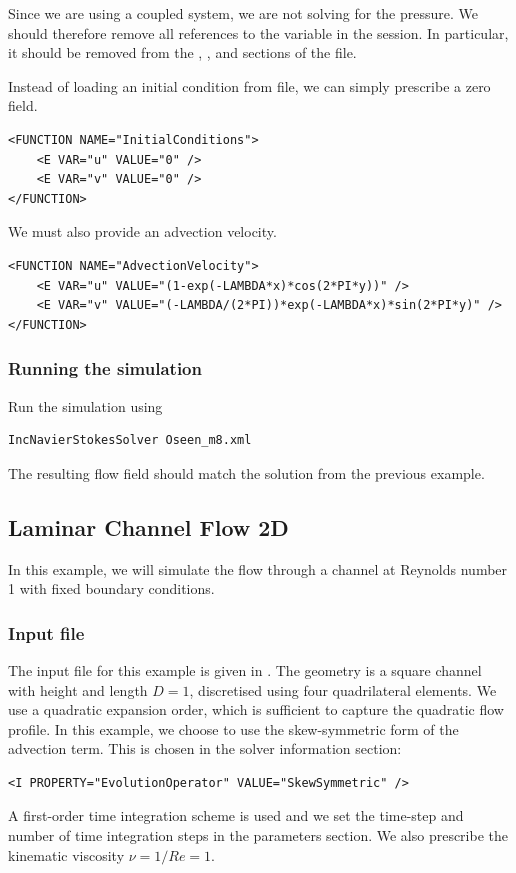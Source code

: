 \begin{notebox}
Since we are using a coupled system, we are not solving for the pressure. We
should therefore remove all references to the variable  in the session.
In particular, it should be removed from the ,
,  and  sections of
the file.
\end{notebox}

Instead of loading an initial condition from file, we can simply prescribe a
zero field.
\begin{lstlisting}[style=XMLStyle]
<FUNCTION NAME="InitialConditions">
    <E VAR="u" VALUE="0" />
    <E VAR="v" VALUE="0" />
</FUNCTION>
\end{lstlisting}

We must also provide an advection velocity.
\begin{lstlisting}[style=XMLStyle]
<FUNCTION NAME="AdvectionVelocity">
    <E VAR="u" VALUE="(1-exp(-LAMBDA*x)*cos(2*PI*y))" />
    <E VAR="v" VALUE="(-LAMBDA/(2*PI))*exp(-LAMBDA*x)*sin(2*PI*y)" />
</FUNCTION>
\end{lstlisting}

\subsubsection{Running the simulation}
Run the simulation using
\begin{lstlisting}[style=BashInputStyle]
IncNavierStokesSolver Oseen_m8.xml
\end{lstlisting}

The resulting flow field should match the solution from the previous example.


\subsection{Laminar Channel Flow 2D}
\label{s:incns:LaminarChannelFlow2D}
In this example, we will simulate the flow through a channel at Reynolds number
1 with fixed boundary conditions.

\subsubsection{Input file}
The input file for this example is given in . The
geometry is a square channel with height and length $D=1$, discretised using
four quadrilateral elements. We use a quadratic expansion order, which is
sufficient to capture the quadratic flow profile. In this example, we choose to
use the skew-symmetric form of the advection term. This is chosen in the solver
information section:
\begin{lstlisting}[style=XMLStyle]
<I PROPERTY="EvolutionOperator" VALUE="SkewSymmetric" />
\end{lstlisting}
A first-order time integration scheme is used and we set the time-step and
number of time integration steps in the parameters section. We also prescribe
the kinematic viscosity $\nu = 1/Re = 1$.

